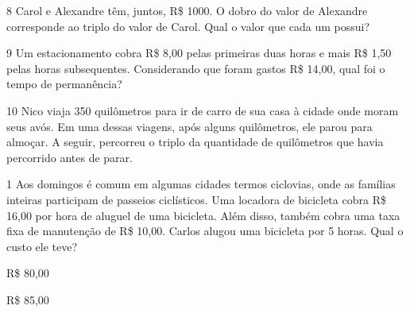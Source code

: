 {{{%


\num{8} Carol e Alexandre têm, juntos, R\$ 1000. O dobro do
valor de Alexandre corresponde ao triplo do valor de Carol. Qual o valor
que cada um possui?



\num{9} Um estacionamento cobra R\$ 8,00 pelas primeiras duas horas e mais
R\$ 1,50 pelas horas subsequentes. Considerando que foram gastos R\$
14,00, qual foi o tempo de permanência?



\num{10} Nico viaja 350 quilômetros para ir de carro de sua casa à cidade
onde moram seus avós. Em uma dessas viagens, após alguns quilômetros,
ele parou para almoçar. A seguir, percorreu o triplo da quantidade de
quilômetros que havia percorrido antes de parar.




\num{1} Aos domingos é comum em algumas cidades termos ciclovias, onde as
famílias inteiras participam de passeios ciclísticos. Uma locadora de bicicleta
cobra R\$ 16,00 por hora de aluguel de uma bicicleta. Além disso,
também cobra uma taxa fixa de manutenção de R\$ 10,00. Carlos alugou uma
bicicleta por 5 horas. Qual o custo ele teve?

\begin{escolha}

  \item R\$ 80,00

  \item R\$ 85,00


\end{escolha}}}}
